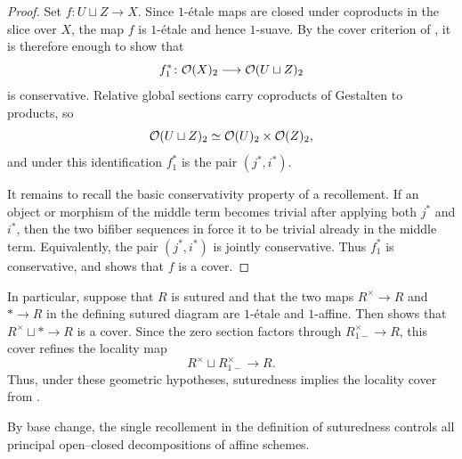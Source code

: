 \documentclass[11pt]{book}
\begin{document}
	\begin{proof}
		Set $f\colon U\sqcup Z\to X$. Since $1$-\'etale maps are closed under coproducts in the slice over $X$, the map $f$ is $1$-\'etale and hence $1$-suave. By the cover criterion of , it is therefore enough to show that
		\[
			f_1^*\colon \mathcal{O}(X)_2\longrightarrow\mathcal{O}(U\sqcup Z)_2
		\]
		is conservative. Relative global sections carry coproducts of Gestalten to products, so
		\[
			\mathcal{O}(U\sqcup Z)_2\simeq\mathcal{O}(U)_2\times\mathcal{O}(Z)_2,
		\]
		and under this identification $f_1^*$ is the pair $(j^*,i^*)$.

		It remains to recall the basic conservativity property of a recollement. If an object or morphism of the middle term becomes trivial after applying both $j^*$ and $i^*$, then the two bifiber sequences in  force it to be trivial already in the middle term. Equivalently, the pair $(j^*,i^*)$ is jointly conservative. Thus $f_1^*$ is conservative, and  shows that $f$ is a cover.
	\end{proof}

	In particular, suppose that $R$ is sutured and that the two maps $R^\times\to R$ and $*\to R$ in the defining sutured diagram are $1$-\'etale and $1$-affine. Then  shows that $R^\times\sqcup *\to R$ is a cover. Since the zero section factors through $R^\times_{1-}\to R$, this cover refines the locality map
	\[
		R^\times\sqcup R^\times_{1-}\longrightarrow R.
	\]
	Thus, under these geometric hypotheses, suturedness implies the locality cover from .

	By base change, the single recollement in the definition of suturedness controls all principal open--closed decompositions of affine schemes.
\end{document}
